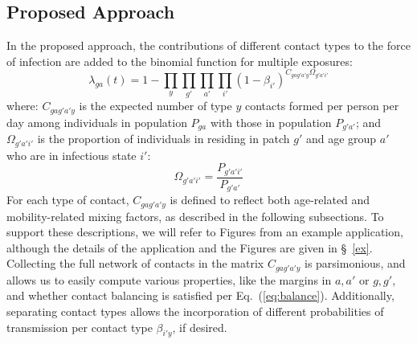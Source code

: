 \subsection{Proposed Approach}\label{meth.prop}
In the proposed approach, the contributions of different contact types to the force of infection
are added to the binomial function for multiple exposures:
\begin{equation}
  \lambda_{ga}(t) = 1 - \prod_{y}\prod_{g'}\prod_{a'}\prod_{i'} {\left(1 - \beta_{i'}\right)}
  ^{C_{gag'a'y} \Omega_{g'a'i'}}
\end{equation}
where:
$C_{gag'a'y}$ is the expected number of type $y$ contacts formed per person per day
among individuals in population $P_{ga}$ with those in population $P_{g'a'}$;
and $\Omega_{g'a'i'}$ is the proportion of individuals in residing in patch $g'$ and age group $a'$
who are in infectious state $i'$:
\begin{equation}
  \Omega_{g'a'i'} = \frac{P_{g'a'i'}}{P_{g'a'}}
\end{equation}
For each type of contact, $C_{gag'a'y}$ is defined to reflect
both age-related and mobility-related mixing factors,
as described in the following subsections.
To support these descriptions, we will refer to Figures from an example application,
although the details of the application and the Figures are given in \S~\ref{ex}.
Collecting the full network of contacts in the matrix $C_{gag'a'y}$ is parsimonious,
and allows us to easily compute various properties, like the margins in $a,a'$ or $g,g'$,
and whether contact balancing is satisfied per Eq.~(\ref{eq:balance}).
Additionally, separating contact types allows the incorporation of
different probabilities of transmission per contact type $\beta_{i'y}$, if desired.

